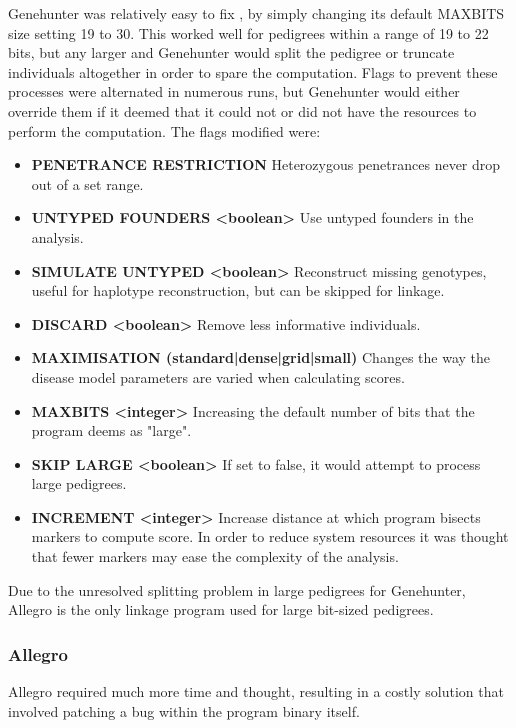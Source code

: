 Genehunter was relatively easy to fix , by simply changing its default MAXBITS size setting 19 to 30. This worked well for pedigrees within a range of 19 to 22 bits, but any larger and Genehunter would split the pedigree or truncate individuals altogether in order to spare the computation. Flags to prevent these processes were alternated in numerous runs, but Genehunter would either override them if it deemed that it could not or did not have the resources  to perform the computation. The flags modified were:

\begin{itemize}
\item{{\bf\footnotesize PENETRANCE RESTRICTION} Heterozygous penetrances never drop out of a set range.}
\item{{\bf\footnotesize UNTYPED FOUNDERS <boolean>} Use untyped founders in the analysis.}
\item{{\bf\footnotesize SIMULATE UNTYPED <boolean>} Reconstruct missing genotypes, useful for haplotype reconstruction, but can be skipped for linkage.}
\item{{\bf\footnotesize DISCARD <boolean>} Remove less informative individuals.}
\item{{\bf\footnotesize MAXIMISATION (standard|dense|grid|small)} Changes the way the disease model parameters are varied when calculating scores.}
\item{{\bf\footnotesize MAXBITS <integer>} Increasing the default number of bits that the program deems as "large".}
\item{{\bf\footnotesize SKIP LARGE <boolean>} If set to false, it would attempt to process large pedigrees.}
\item{{\bf\footnotesize INCREMENT <integer>} Increase distance at which program bisects markers to compute score. In order to reduce system resources it was thought that fewer markers may ease the complexity of the analysis.}
\end{itemize}

Due to the unresolved splitting problem in large pedigrees for Genehunter, Allegro is the only linkage program used for large bit-sized pedigrees.


\subsubsection{Allegro}\label{ref:meth:allegrobigdata}

Allegro required much more time and thought, resulting in a costly solution that involved patching a bug within the program binary itself.  

